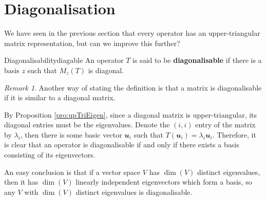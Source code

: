 \documentclass[math, code]{amznotes}
\theoremstyle{remark}
\newtheorem*{remark}{Remark}
\begin{document}
\section{Diagonalisation}
We have seen in the previous section that every operator has an upper-triangular matrix representation, but can we improve this further?
\begin{dfnbox}{Diagonalisability}{diagable}
    An operator $T$ is said to be {\color{red} \textbf{diagonalisable}} if there is a basis $z$ such that $M_z\left(T\right)$ is diagonal.
\end{dfnbox}
\begin{notebox}
    \begin{remark}
        Another way of stating the definition is that a matrix is diagonalisable if it is similar to a diagonal matrix.
    \end{remark}
\end{notebox}
By Proposition \ref{pro:upTriEigen}, since a diagonal matrix is upper-triangular, its diagonal entries must be the eigenvalues. Denote the $(i, i)$ entry of the matrix by $\lambda_i$, then there is some basic vector $\mathbfit{u}_i$ such that $T(\mathbfit{u}_i) = \lambda_i\mathbfit{u}_i$. Therefore, it is clear that an operator is diagonalisable if and only if there exists a basis consisting of its eigenvectors.

An easy conclusion is that if a vector space $V$ has $\dim(V)$ distinct eigenvalues, then it has $\dim(V)$ linearly independent eigenvectors which form a basis, so any $V$ with $\dim(V)$ distinct eigenvalues is diagonalisable.
\end{document}
